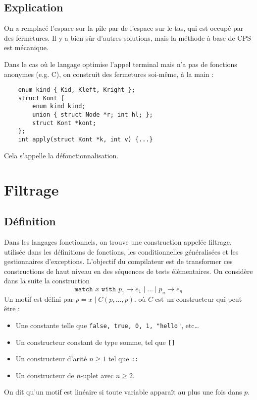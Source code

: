 \documentclass{cours}
\begin{document}
\subsection{Explication}
On a remplacé l'espace sur la pile par de l'espace sur le tas, qui est occupé par des fermetures. Il y a bien sûr d'autres solutions, mais la méthode à base de CPS est mécanique.

Dans le cas où le langage optimise l'appel terminal mais n'a pas de fonctions anonymes (e.g. C), on construit des fermetures soi-même, à la main : 
\begin{verbatim}
    enum kind { Kid, Kleft, Kright };
    struct Kont {
        enum kind kind;
        union { struct Node *r; int hl; };
        struct Kont *kont;
    };
    int apply(struct Kont *k, int v) {...}
\end{verbatim}

Cela s'appelle la défonctionnalisation.

\section{Filtrage}
\subsection{Définition}
Dans les langages fonctionnels, on trouve une construction appelée filtrage, utilisée dans les définitions de fonctions, les conditionnelles généralisées et les gestionnaires d'exceptions. L'objectif du compilateur est de transformer ces constructions de haut niveau en des séquences de tests élémentaires. On considère dans la suite la construction 
\[
    \texttt{match } x \texttt{ with } p_{1} \rightarrow e_{1} \mid \ldots \mid p_{n} \rightarrow e_{n}
\]
Un motif est défini par $p = x \mid C(p, \ldots, p)$. où $C$ est un constructeur qui peut être : 
\begin{itemize}
    \item Une constante telle que \texttt{false, true, 0, 1, "hello"}, etc\dots
    \item Un constructeur constant de type somme, tel que \texttt{[]}
    \item Un constructeur d'arité $n \geq 1$ tel que \texttt{::}
    \item Un constructeur de $n$-uplet avec $n \geq 2$.
\end{itemize}

\begin{definition}
    On dit qu'un motif est linéaire si toute variable apparaît au plus une fois dans $p$. 
\end{definition}
\end{document}
